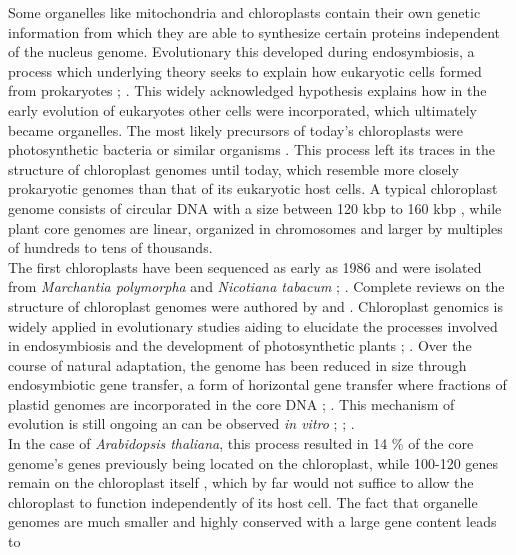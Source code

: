 Some organelles like mitochondria and chloroplasts contain their own genetic information
from which they are able to synthesize certain proteins independent of the nucleus
genome. Evolutionary this developed during endosymbiosis, a process which underlying
theory seeks to explain how eukaryotic cells formed from prokaryotes
\cite{mereschkowsky1905uber}; \cite{kutschera2005endosymbiosis}. This widely acknowledged
hypothesis explains how in the early evolution of eukaryotes other cells were
incorporated, which ultimately became organelles. The most likely precursors of today's
chloroplasts were photosynthetic bacteria or similar organisms
\cite{archibald2015endosymbiosis}. This process left its traces in the structure of
chloroplast genomes until today, which resemble more closely prokaryotic genomes than that
of its eukaryotic host cells. A typical chloroplast genome consists of circular DNA with a
size between 120 kbp to 160 kbp \cite{palmer_1985}, while plant core genomes are linear,
organized in chromosomes and larger by multiples of
hundreds to tens of thousands. \\
The first chloroplasts have been sequenced as early as 1986 and were isolated from
\textit{Marchantia polymorpha} and \textit{Nicotiana tabacum}
\cite{ohyama_chloroplast_1986}; \cite{shinozaki_complete_1986}. Complete reviews on the
structure of chloroplast genomes were authored by \cite{green_chloroplast_2011} and
\cite{wicke_evolution_2011}. Chloroplast genomics is widely applied in evolutionary
studies aiding to elucidate the processes involved in endosymbiosis and the development of
photosynthetic plants \cite{martin_evolutionary_2002};
\cite{xiao-ming_inferring_2017}. Over the course of natural adaptation, the genome has
been reduced in size through endosymbiotic gene transfer, a form of horizontal gene
transfer where fractions of plastid genomes are incorporated in the core DNA
\cite{martin_evolutionary_2002}; \cite{deiner_environmental_2017}. This mechanism of
evolution is still ongoing an can be observed \textit{in vitro} \cite{bock2017witnessing};
\cite{fuentes2014horizontal}; \cite{stegemann2009exchange}. \\
In the case of \textit{Arabidopsis thaliana}, this process resulted in 14 \% of the core
genome's genes previously being located on the chloroplast, while 100-120 genes remain on
the chloroplast itself \cite{wicke_evolution_2011}, which by far would not suffice to
allow the chloroplast to function independently of its host cell. The fact that organelle
genomes are much smaller and highly conserved with a large gene content leads to
